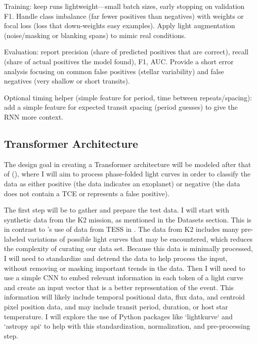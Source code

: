 \documentclass[letterpaper]{article} %
\begin{document}
Training: keep runs lightweight—small batch sizes, early stopping on validation F1. Handle class imbalance (far fewer positives than negatives) with weights or focal loss (loss that down-weights easy examples). Apply light augmentation (noise/masking or blanking spans) to mimic real conditions.

Evaluation: report precision (share of predicted positives that are correct), recall (share of actual positives the model found), F1, AUC. Provide a short error analysis focusing on common false positives (stellar variability) and false negatives (very shallow or short transits).

Optional timing helper (simple feature for period, time between repeats/spacing): add a simple feature for expected transit spacing (period guesses) to give the RNN more context.

\subsection{Transformer Architecture}

The design goal in creating a Transformer architecture will be modeled after that of \citeauthor{salinas2023distinguishingtransitfalsepositives} (\citeyear{salinas2023distinguishingtransitfalsepositives}), where I will aim to process phase-folded light curves in order to classify the data as either positive (the data indicates an exoplanet) or negative (the data does not contain a TCE or represents a false positive). 

The first step will be to gather and prepare the test data. I will start with synthetic data from the K2 mission, as mentioned in the Datasets section. This is in contrast to \citeauthor{salinas2023distinguishingtransitfalsepositives}'s use of data from TESS in \citeyear{salinas2023distinguishingtransitfalsepositives}. The data from K2 includes many pre-labeled variations of possible light curves that may be encountered, which reduces the complexity of curating our data set. Because this data is minimally processed, I will need to standardize and detrend the data to help process the input, without removing or masking important trends in the data. Then I will need to use a simple CNN to embed relevant information in each token of a light curve and create an input vector that is a better representation of the event. This information will likely include temporal positional data, flux data, and centroid pixel position data, and may include transit period, duration, or host star temperature. I will explore the use of Python packages like ‘lightkurve‘ and ‘astropy api‘ to help with this standardization, normalization, and pre-processing step.
\end{document}
